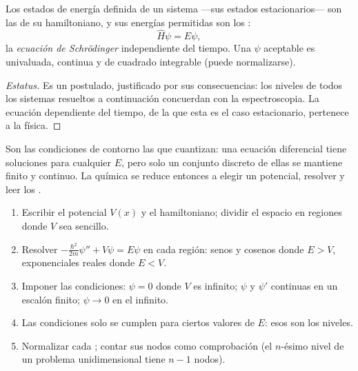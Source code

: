 \begin{theorem}\label{thm:b3:quantum-model-systems:schrodinger}
Los estados de energía definida de un sistema ---sus estados estacionarios--- son
las  de su hamiltoniano, y sus energías permitidas son los
:
\[
\hat H\psi = E\psi,
\]
la \emph{ecuación de Schrödinger} independiente del tiempo.
Una $\psi$ aceptable es univaluada, continua y
de cuadrado integrable (puede normalizarse).
\end{theorem}
\begin{proof}[Estatus]
Es un postulado, justificado por sus consecuencias: los niveles de todos los
sistemas resueltos a continuación concuerdan con la espectroscopia. La ecuación dependiente del tiempo,
de la que esta es el caso estacionario, pertenece a la física.
\end{proof}

Son las condiciones de contorno las que cuantizan: una ecuación diferencial tiene
soluciones para cualquier $E$, pero solo un conjunto discreto de ellas se mantiene finito y
continuo. La química se reduce entonces a elegir un potencial, resolver
y leer los .

\begin{method}\label{met:b3:quantum-model-systems:one-dimensional}
\begin{enumerate}
  \item Escribir el potencial $V(x)$ y el hamiltoniano; dividir el espacio en
        regiones donde $V$ sea sencillo.
  \item Resolver $-\frac{\hbar^2}{2m}\psi'' + V\psi = E\psi$ en cada región: senos
        y cosenos donde $E > V$, exponenciales reales donde $E < V$.
  \item Imponer las condiciones: $\psi = 0$ donde $V$ es infinito; $\psi$
        y $\psi'$ continuas en un escalón finito; $\psi \to 0$ en el infinito.
  \item Las condiciones solo se cumplen para ciertos valores de $E$: esos son los niveles.
  \item Normalizar cada ; contar sus nodos como comprobación (el
        $n$-ésimo nivel de un problema unidimensional tiene $n - 1$ nodos).
\end{enumerate}
\end{method}

